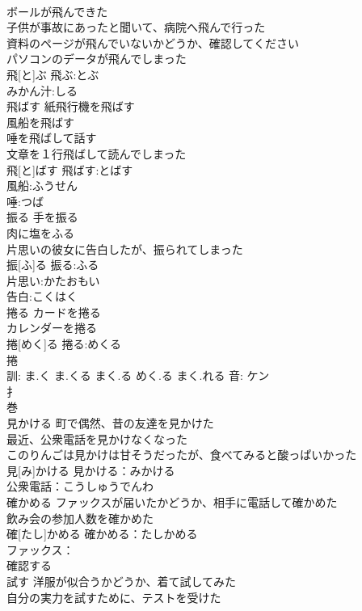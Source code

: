 \documentclass[8pt]{extreport}
\begin{document}
\begin{CJK}{UTF8}{min}
\\	ボールが飛んできた 
\\	子供が事故にあったと聞いて、病院へ飛んで行った 
\\	資料のページが飛んでいないかどうか、確認してください 
\\	パソコンのデータが飛んでしまった 
\\	飛[と]ぶ			飛ぶ:とぶ
\\	みかん汁:しる
\\	飛ばす	紙飛行機を飛ばす 
\\	風船を飛ばす 
\\	唾を飛ばして話す 
\\	文章を１行飛ばして読んでしまった 
\\	飛[と]ばす			飛ばす:とばす
\\	風船:ふうせん
\\	唾:つば
\\	振る	手を振る 
\\	肉に塩をふる 
\\	片思いの彼女に告白したが、振られてしまった 
\\	振[ふ]る			振る:ふる
\\	片思い:かたおもい
\\	告白:こくはく
\\	捲る	カードを捲る 
\\	カレンダーを捲る 
\\	捲[めく]る			捲る:めくる
\\	捲 
\\	訓: ま.く ま.くる まく.る めく.る まく.れる 音: ケン 
\\	扌 
\\	巻 
\\	見かける	町で偶然、昔の友達を見かけた 
\\	最近、公衆電話を見かけなくなった 
\\	このりんごは見かけは甘そうだったが、食べてみると酸っぱいかった 
\\	見[み]かける			見かける：みかける
\\	公衆電話：こうしゅうでんわ
\\	確かめる	ファックスが届いたかどうか、相手に電話して確かめた 
\\	飲み会の参加人数を確かめた 
\\	確[たし]かめる			確かめる：たしかめる
\\	ファックス：
\\	確認する 
\\	試す	洋服が似合うかどうか、着て試してみた 
\\	自分の実力を試すために、テストを受けた 

\end{CJK}
\end{document}
